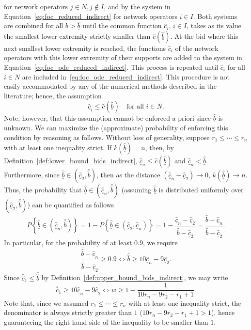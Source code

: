 for network operators $j\in N, j\not\in I$, and by the system in Equation~\eqref{eq:foc_reduced_indirect} for network operators $i\in I$. Both systems are combined for all $b > \underline{\hat{b}}$ until the common function $\hat{c}_i$, $i\in I$, takes as its value the smallest lower extremity strictly smaller than $\hat{c}(\underline{\hat{b}})$. At the bid where this next smallest lower extremity is reached, the functions $\hat{c}_i$ of the network operators with this lower extremity of their supports are added to the system in Equation~\eqref{eq:foc_ode_reduced_indirect}. This process is repeated until $\hat{c}_i$ for all $i\in N$ are included in~\eqref{eq:foc_ode_reduced_indirect}. This procedure is not easily accommodated by any of the numerical methods described in the literature; hence, the assumption
\begin{equation*}
  \underline{\hat{c}}_i \leq \hat{c}(\underline{\hat{b}}) \quad\textrm{for all } i\in N.
\end{equation*}
Note, however, that this assumption cannot be enforced a priori since $\underline{\hat{b}}$ is unknown. We can maximize the (approximate) probability of enforcing this condition by reasoning as follows. Without loss of generality, suppose $r_1\leq\cdots\leq r_n$ with at least one inequality strict. If $k(\underline{\hat{b}})=n$, then, by Definition~\ref{def:lower_bound_bids_indirect}, $\underline{\hat{c}}_n\leq \hat{c}(\underline{\hat{b}})$ and $\underline{\hat{c}}_n < \underline{\hat{b}}$. Furthermore, since $\underline{\hat{b}}\in (\underline{\hat{c}}_2, \bar{\hat{b}})$, then as the distance $(\underline{\hat{c}}_n-\underline{\hat{c}}_2)\to 0$, $k(\underline{\hat{b}})\to n$. Thus, the probability that $\underline{\hat{b}}\in (\underline{\hat{c}}_n, \bar{\hat{b}})$ (assuming $\underline{\hat{b}}$ is distributed uniformly over $(\underline{\hat{c}}_2, \bar{\hat{b}})$) can be quantified as follows
\begin{equation*}
  P\left\{ \underline{\hat{b}}\in (\underline{\hat{c}}_n, \bar{\hat{b}}) \right\} = 1 - P\left\{\underline{\hat{b}}\in(\underline{\hat{c}}_2, \underline{\hat{c}}_n)\right\} = 1 - \frac{\underline{\hat{c}}_n - \underline{\hat{c}}_2}{\bar{\hat{b}}-\underline{\hat{c}}_2} = \frac{\bar{\hat{b}} - \underline{\hat{c}}_n}{\bar{\hat{b}} - \underline{\hat{c}}_2}.
\end{equation*}
In particular, for the probability of at least $0.9$, we require
\begin{equation*}
  \frac{\bar{\hat{b}} - \underline{\hat{c}}_n}{\bar{\hat{b}} - \underline{\hat{c}}_2} \geq 0.9 \iff \bar{\hat{b}}\geq 10\underline{\hat{c}}_n - 9\underline{\hat{c}}_2.
\end{equation*}
Since $\bar{\hat{c}}_1\leq \bar{\hat{b}}$ by Definition~\ref{def:upper_bound_bids_indirect}, we may write
\begin{equation*}
  \bar{\hat{c}}_1 \geq 10\underline{\hat{c}}_n - 9\underline{\hat{c}}_2 \iff w \geq 1 - \frac{1}{10r_n - 9r_2 - r_1 + 1}.
\end{equation*}
Note that, since we assumed $r_1\leq\cdots\leq r_n$ with at least one inequality strict, the denominator is always strictly greater than $1$ ($10r_n - 9r_2-r_1+1 > 1$), hence guaranteeing the right-hand side of the inequality to be smaller than $1$.

